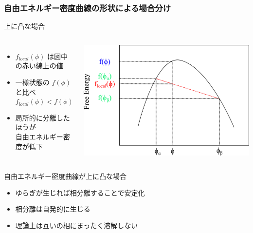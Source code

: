 \documentclass[unicode,12pt]{beamer}%
\begin{document}
\begin{frame}
	\frametitle{自由エネルギー密度曲線の形状による場合分け}
		\begin{block}{上に凸な場合}
			\begin{columns}[c, onlytextwidth]
					\begin{itemize}
						\item $f_{local}(\phi)$ は図中の赤い線上の値
						\item 一様状態の $f (\phi)$ と比べ\\
						$f_{local}(\phi) < f (\phi)$
						\item \alert{局所的に分離したほうが\\自由エネルギー密度が低下}
					\end{itemize}
						\centering
							\includegraphics[width=\textwidth]{freeEform_3.png}
			\end{columns}
		\end{block}
 
		\begin{alertblock}{自由エネルギー密度曲線が上に凸な場合}
			\begin{itemize}
				\item ゆらぎが生じれば相分離することで安定化
				\item \alert{相分離は自発的}に生じる
				\item 理論上は\alert{互いの相にまったく溶解しない}
			\end{itemize}
		\end{alertblock}
\end{frame}
\end{document}
